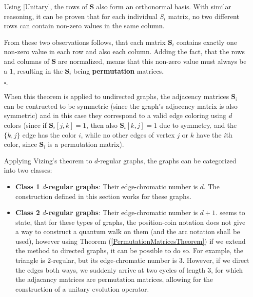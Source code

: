 Using \hyperref[Unitary]{[Unitary]}, the rows of $\mathbf{S}$ also form an orthonormal basis. With similar reasoning, it can be proven that for each individual $S_i$ matrix, no two different rows can contain non-zero values in the same column.

From these two observations follows, that each matrix $\mathbf{S}_i$ contains exactly one non-zero value in each row and also each column. Adding the fact, that the rows and columns of $\mathbf{S}$ are normalized, means that this non-zero value must always be a $1$, resulting in the $\mathbf{S}_i$ being \textbf{permutation} matrices.

\begin{flushright}
$\square{}.$
\end{flushright}

When this theorem is applied to undirected graphs, the adjacency matrices $\mathbf{S}_i$ can be contructed to be symmetric (since the graph's adjacency matrix is also symmetric) and in this case they correspond to a valid edge coloring using $d$ colors (since if $\mathbf{S}_i[j,k] = 1$, then also $\mathbf{S}_i[k,j] = 1$ due to symmetry, and the $\{k,j\}$ edge has the color $i$, while no other edges of vertex $j$ or $k$ have the $i$th color, since $\mathbf{S}_i$ is a permutation matrix).

Applying Vizing's theorem to $d$-regular graphs, the graphs can be categorized into two classes:
\begin{itemize}
\item \textbf{Class 1 $d$-regular graphs}: Their edge-chromatic number is $d$. The construction defined in this section works for these graphs.
\item \textbf{Class 2 $d$-regular graphs}: Their edge-chromatic number is $d+1$. \cite{Portugal} seems to state, that for these types of graphs, the position-coin notation does not give a way to construct a quantum walk on them (and the arc notation shall be used), however using Theorem (\ref{PermutationMatricesTheorem}) if we extend the method to directed graphs, it can be possible to do so. For example, the triangle is $2$-regular, but its edge-chromatic number is $3$. However, if we direct the edges both ways, we suddenly arrive at two cycles of length 3, for which the adjacancy matrices are permutation matrices, allowing for the construction of a unitary evolution operator.

\end{itemize}
